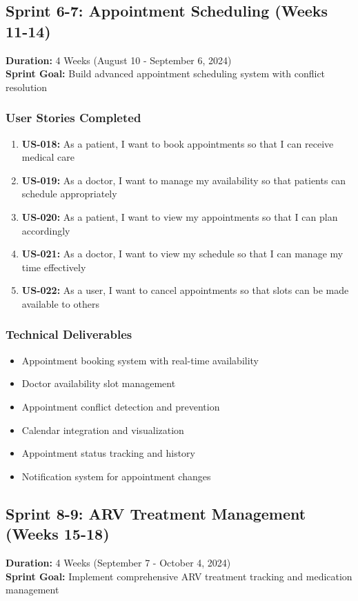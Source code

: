 \documentclass[12pt,a4paper]{article}
\begin{document}
\subsection{Sprint 6-7: Appointment Scheduling (Weeks 11-14)}
\textbf{Duration:} 4 Weeks (August 10 - September 6, 2024) \\
\textbf{Sprint Goal:} Build advanced appointment scheduling system with conflict resolution

\subsubsection{User Stories Completed}
\begin{enumerate}
    \item \textbf{US-018:} As a patient, I want to book appointments so that I can receive medical care
    \item \textbf{US-019:} As a doctor, I want to manage my availability so that patients can schedule appropriately
    \item \textbf{US-020:} As a patient, I want to view my appointments so that I can plan accordingly
    \item \textbf{US-021:} As a doctor, I want to view my schedule so that I can manage my time effectively
    \item \textbf{US-022:} As a user, I want to cancel appointments so that slots can be made available to others
\end{enumerate}

\subsubsection{Technical Deliverables}
\begin{itemize}
    \item Appointment booking system with real-time availability
    \item Doctor availability slot management
    \item Appointment conflict detection and prevention
    \item Calendar integration and visualization
    \item Appointment status tracking and history
    \item Notification system for appointment changes
\end{itemize}

\subsection{Sprint 8-9: ARV Treatment Management (Weeks 15-18)}
\textbf{Duration:} 4 Weeks (September 7 - October 4, 2024) \\
\textbf{Sprint Goal:} Implement comprehensive ARV treatment tracking and medication management
\end{document}

